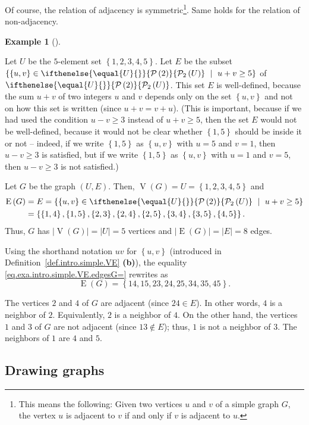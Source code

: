 \documentclass[numbers=enddot,12pt,final,onecolumn,notitlepage]{scrartcl}%
\theoremstyle{definition}
\newtheorem{exam}[theo]{Example}
\newenvironment{example}[1][]
{\begin{exam}[#1]\begin{leftbar}}
{\end{leftbar}\end{exam}}
\newcommand{\powset}[2][]{\ifthenelse{\equal{#2}{}}{\mathcal{P}\left(#1\right)}{\mathcal{P}_{#1}\left(#2\right)}}
\newcommand{\set}[1]{\left\{ #1 \right\}}
\newcommand{\abs}[1]{\left| #1 \right|}
\newcommand{\tup}[1]{\left( #1 \right)}
\newcommand{\verts}[1]{\operatorname{V}\left( #1 \right)}
\newcommand{\edges}[1]{\operatorname{E}\left( #1 \right)}
\begin{document}
Of course, the relation of adjacency is symmetric\footnote{This means
the following: Given two vertices $u$ and $v$ of a simple graph $G$,
the vertex $u$ is adjacent to $v$ if and only if $v$ is adjacent to
$u$.}. Same holds for the relation of non-adjacency.

\begin{example} \label{exa.intro.simple.VE}
Let $U$ be the $5$-element set $\set{1,2,3,4,5}$. Let $E$ be the
subset $\set{\set{u,v} \in \powset[2]{U} \ \mid \ u + v \geq 5 }$
of $\powset[2]{U}$. This set $E$ is well-defined, because the sum
$u + v$ of two integers $u$ and $v$ depends only on the set
$\set{u,v}$ and not on how this set is written (since
$u + v = v + u$). (This is important, because if we had used the
condition $u - v \geq 3$ instead of $u + v \geq 5$, then the set $E$
would not be well-defined, because it would not be clear whether
$\set{1, 5}$ should be inside it or not -- indeed, if we write
$\set{1, 5}$ as $\set{u, v}$ with $u = 5$ and $v = 1$, then
$u - v \geq 3$ is satisfied, but if we write $\set{1, 5}$ as
$\set{u, v}$ with $u = 1$ and $v = 5$, then $u - v \geq 3$ is not
satisfied.)

Let $G$ be the graph $\tup{U, E}$. Then, $\verts{G} = U
= \set{1,2,3,4,5}$ and
\begin{align}
\edges{G} &= E
= \set{\set{u,v} \in \powset[2]{U} \ \mid \ u + v \geq 5 }
\nonumber \\
&= \set{\set{1,4}, \set{1,5},
        \set{2,3}, \set{2,4}, \set{2,5},
        \set{3,4}, \set{3,5},
        \set{4,5}} .
\label{eq.exa.intro.simple.VE.edgesG=}
\end{align}
Thus, $G$ has $\abs{\verts{G}} = \abs{U} = 5$ vertices and
$\abs{\edges{G}} = \abs{E} = 8$ edges.

Using the shorthand notation
$uv$ for $\set{u, v}$ (introduced in
Definition~\ref{def.intro.simple.VE} \textbf{(b)}), the equality
\eqref{eq.exa.intro.simple.VE.edgesG=} rewrites as
\[
\edges{G}
= \set{14, 15, 23, 24, 25, 34, 35, 45} .
\]

The vertices $2$ and $4$ of $G$ are adjacent (since $24 \in E$).
In other words, $4$ is a neighbor of $2$. Equivalently, $2$ is a
neighbor of $4$. On the other hand, the vertices $1$ and $3$ of $G$
are not adjacent (since $13 \notin E$); thus, $1$ is not a neighbor
of $3$. The neighbors of $1$ are $4$ and $5$.
\end{example}

\subsection{\label{sect.intro.draw}Drawing graphs}
\end{document}

